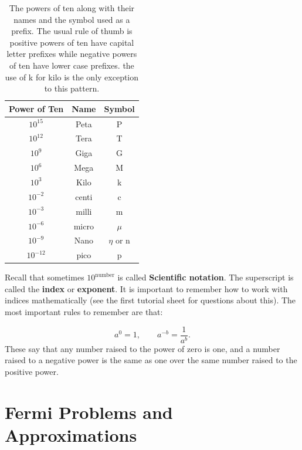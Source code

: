 \documentclass[a4paper,12pt]{book}
\begin{document}
\begin{table}[ht]
\centering
\caption{The powers of ten along with their names and the symbol used as a prefix. The usual rule of thumb is positive powers of ten have capital letter prefixes while negative powers of ten have lower case prefixes. the use of k for kilo is the only exception to this pattern.}

\vspace{4mm}

\label{table:1}



\begin{tabular}{|c|c|c|} 
 \hline
 \textbf{Power of Ten} & \textbf{Name} & \textbf{Symbol}\\
 \hline
 $10^{15}$ & Peta & P \\
 \hline
$10^{12}$ &	Tera & T \\
\hline
$10^{9}$ &	Giga & G	\\
\hline
$10^{6}$ &	Mega & M	\\
\hline
$10^{3}$ &	Kilo & k	\\
\hline
$10^{-2}$ &	centi & c	\\
\hline
$10^{-3}$ &	milli & m \\
\hline
$10^{-6}$ &	micro & $\mu$	\\
\hline
$10^{-9}$ &	Nano & $\eta$ or n	\\
\hline
$10^{-12}$ &pico & p\\
\hline
\end{tabular}
\end{table}

Recall that sometimes $10^{\text{number}}$ is called \textbf{Scientific notation}. The superscript is called the \textbf{index} or \textbf{exponent}. It is important to remember how to work with indices mathematically (see the first tutorial sheet for questions about this). The most important rules to remember are that:

\begin{equation*}
    a^{0}=1, \qquad a^{-b}=\frac{1}{a^{b}}.
\end{equation*}
These say that any number raised to the power of zero is one, and a number raised to a negative power is the same as one over the same number raised to the positive power.

\chapter{Fermi Problems and Approximations}
\end{document}
